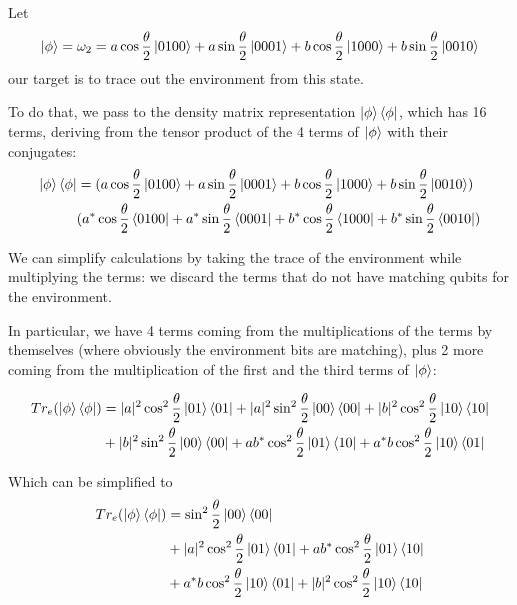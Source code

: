 \documentclass{masterthesis}
\begin{document}
Let
\begin{equation}
    \ket{\phi} = \omega_2 = a\cos\frac{\theta}{2}\ket{0100} + a\sin\frac{\theta}{2}\ket{0001} + b\cos\frac{\theta}{2}\ket{1000} + b\sin\frac{\theta}{2}\ket{0010}
\end{equation}
our target is to trace out the environment from this state.

To do that, we pass to the density matrix representation $\ket{\phi}\bra{\phi}$, which has 16 terms, deriving from the tensor product of the 4 terms of $\ket{\phi}$ with their conjugates:
\begin{align}
    \ket{\phi}\bra{\phi} &= (a\cos\frac{\theta}{2}\ket{0100} + a\sin\frac{\theta}{2}\ket{0001} + b\cos\frac{\theta}{2}\ket{1000} + b\sin\frac{\theta}{2}\ket{0010}) \nonumber \\
    &(a^{*}\cos\frac{\theta}{2}\bra{0100} + a^{*}\sin\frac{\theta}{2}\bra{0001} + b^{*}\cos\frac{\theta}{2}\bra{1000} + b^{*}\sin\frac{\theta}{2}\bra{0010})
\end{align}

We can simplify calculations by taking the trace of the environment while multiplying the terms: we discard the terms that do not have matching qubits for the environment.

In particular, we have 4 terms coming from the multiplications of the terms by themselves (where obviously the environment bits are matching), plus 2 more coming from the multiplication of the first and the third terms of $\ket{\phi}$:

\begin{align}
    Tr_e(\ket{\phi}\bra{\phi}) &= |a|^2 \cos^2 \frac{\theta}{2}\ket{01}\bra{01} + |a|^2 \sin^2 \frac{\theta}{2}\ket{00}\bra{00} + |b|^2 \cos^2 \frac{\theta}{2}\ket{10}\bra{10} \\
    & + |b|^2 \sin^2 \frac{\theta}{2}\ket{00}\bra{00} + a b^{*} \cos^2 \frac{\theta}{2} \ket{01}\bra{10} + a^{*} b \cos^2 \frac{\theta}{2} \ket{10}\bra{01} 
\end{align}

Which can be simplified to 
\begin{align}
    Tr_e(\ket{\phi}\bra{\phi}) &= \sin^2 \frac{\theta}{2}\ket{00}\bra{00} \\ 
    & + |a|^2 \cos^2 \frac{\theta}{2}\ket{01}\bra{01} + a b^{*} \cos^2 \frac{\theta}{2} \ket{01}\bra{10} \\
    & + a^{*} b \cos^2 \frac{\theta}{2} \ket{10}\bra{01} + |b|^2 \cos^2 \frac{\theta}{2}\ket{10}\bra{10}
\end{align}
\end{document}

